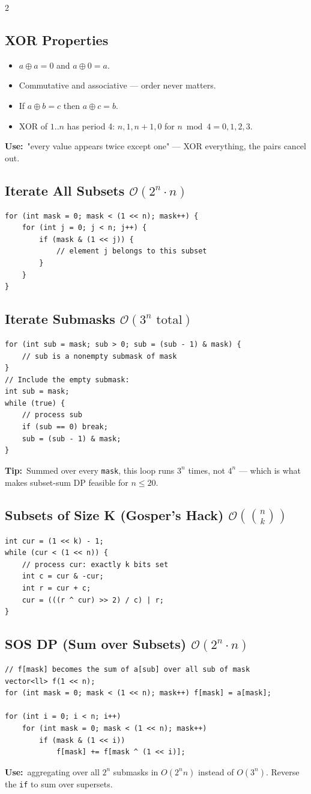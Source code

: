 \documentclass[10pt]{article}
\newcommand{\code}[1]{\texttt{\small #1}}
\newcommand{\sub}[2]{\subsection[#1]{#1\hspace{0.6em}%
  \textnormal{\color{accent2}\small$\mathcal{O}(#2)$}}}
\newcommand{\uses}[1]{{\color{accent2}\footnotesize\textbf{Use:}}~{\footnotesize #1}\par}
\newcommand{\tip}[1]{{\color{tipc}\footnotesize\textbf{Tip:}}~{\footnotesize #1}\par}
\begin{document}
\begin{multicols}{2}
\subsection{XOR Properties}
\begin{itemize}
    \item $a \oplus a = 0$ and $a \oplus 0 = a$.
    \item Commutative and associative --- order never matters.
    \item If $a \oplus b = c$ then $a \oplus c = b$.
    \item XOR of $1..n$ has period 4: $n, 1, n+1, 0$ for
          $n \bmod 4 = 0,1,2,3$.
\end{itemize}
\uses{"every value appears twice except one" --- XOR everything, the
pairs cancel out.}

\sub{Iterate All Subsets}{2^n \cdot n}
\begin{lstlisting}
for (int mask = 0; mask < (1 << n); mask++) {
    for (int j = 0; j < n; j++) {
        if (mask & (1 << j)) {
            // element j belongs to this subset
        }
    }
}
\end{lstlisting}

\sub{Iterate Submasks}{3^n \text{ total}}
\begin{lstlisting}
for (int sub = mask; sub > 0; sub = (sub - 1) & mask) {
    // sub is a nonempty submask of mask
}
// Include the empty submask:
int sub = mask;
while (true) {
    // process sub
    if (sub == 0) break;
    sub = (sub - 1) & mask;
}
\end{lstlisting}
\tip{Summed over every \code{mask}, this loop runs $3^n$ times, not
$4^n$ --- which is what makes subset-sum DP feasible for $n \le 20$.}

\sub{Subsets of Size K (Gosper's Hack)}{\binom{n}{k}}
\begin{lstlisting}
int cur = (1 << k) - 1;
while (cur < (1 << n)) {
    // process cur: exactly k bits set
    int c = cur & -cur;
    int r = cur + c;
    cur = (((r ^ cur) >> 2) / c) | r;
}
\end{lstlisting}

\sub{SOS DP (Sum over Subsets)}{2^n \cdot n}
\begin{lstlisting}
// f[mask] becomes the sum of a[sub] over all sub of mask
vector<ll> f(1 << n);
for (int mask = 0; mask < (1 << n); mask++) f[mask] = a[mask];

for (int i = 0; i < n; i++)
    for (int mask = 0; mask < (1 << n); mask++)
        if (mask & (1 << i))
            f[mask] += f[mask ^ (1 << i)];
\end{lstlisting}
\uses{aggregating over all $2^n$ submasks in $O(2^n n)$ instead of
$O(3^n)$. Reverse the \code{if} to sum over supersets.}


\end{multicols}
\end{document}
